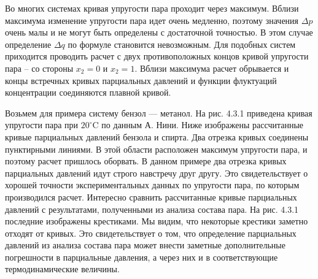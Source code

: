 Во многих системах кривая упругости пара проходит через максимум.
Вблизи максимума изменение упругости пара идет очень медленно,
поэтому значения $\Delta p$ очень малы и не могут быть определены
с достаточной точностью. В этом случае определение $\Delta q$ по
формуле  становится невозможным. Для подобных систем
приходится проводить расчет с двух противоположных концов кривой
упругости пара -- со стороны $x_2=0$ и $x_2=1$. Вблизи максимума
расчет обрывается и концы встречных кривых парциальных давлений и
функции флуктуаций концентрации соединяются плавной кривой.

Возьмем для примера систему бензол --- метанол. На рис. 4.3.1
приведена кривая упругости пара при $20^{\circ}$C по данным А.
Нини. Ниже изображены рассчитанные кривые парциальных
давлений бензола и спирта. Два отрезка кривых соединены
пунктирными линиями. В этой области расположен максимум упругости
пара, и поэтому расчет пришлось оборвать. В данном примере два
отрезка кривых парциальных давлений идут строго навстречу друг
другу. Это свидетельствует о хорошей точности экспериментальных
данных по упругости пара, по которым производился расчет.
Интересно сравнить рассчитанные кривые парциальных давлений с
результатами, полученными из анализа состава пара. На рис. 4.3.1
последние изображены крестиками. Мы видим, что некоторые крестики
заметно отходят от кривых. Это свидетельствует о том, что
определение парциальных давлений из анализа состава пара может
внести заметные дополнительные погрешности в парциальные
давления, а через них и в соответствующие термодинамические
величины.

